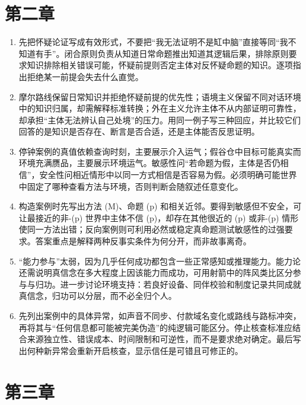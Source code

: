 \section*{第二章}

\begin{enumerate}
\item 先把怀疑论证写成有效形式，不要把“我无法证明不是缸中脑”直接等同“我不知道有手”。闭合原则负责从知道日常命题推出知道其逻辑后果，排除原则要求知识排除相关错误可能，怀疑前提则否定主体对反怀疑命题的知识。逐项指出拒绝某一前提会失去什么直觉。
\item 摩尔路线保留日常知识并拒绝怀疑前提的优先性；语境主义保留不同对话环境中的知识归属，却需解释标准转换；外在主义允许主体不从内部证明可靠性，却承担“主体无法辨认自己处境”的压力。用同一例子写三种回应，并比较它们回答的是知识是否存在、断言是否合适，还是主体能否反思证明。
\item 停钟案例的真值依赖查询时刻，主要展示介入运气；假谷仓中目标可能真实而环境充满赝品，主要展示环境运气。敏感性问“若命题为假，主体是否仍相信”，安全性问相近情形中以同一方式相信是否容易为假。必须明确可能世界中固定了哪种查看方法与环境，否则判断会随叙述任意变化。
\item 构造案例时先写出方法 (M)、命题 (p) 和相关近邻。要得到敏感但不安全，可让最接近的非-(p) 世界中主体不信 (p)，却存在其他很近的 (p) 或非-(p) 情形使同一方法出错；反向案例则可利用必然或稳定真命题测试敏感性的过强要求。答案重点是解释两种反事实条件为何分开，而非故事离奇。
\item “能力参与”太弱，因为几乎任何成功都包含一些正常感知或推理能力。能力论还需说明真信念在多大程度上因该能力而成功，可用射箭中的阵风类比区分参与与归功。进一步讨论环境支持：若良好设备、同伴校验和制度记录共同成就真信念，归功可以分层，而不必全归个人。
\item 先列出案例中的具体异常，如声音不同步、付款域名变化或路线与路标冲突，再将其与“任何信息都可能被完美伪造”的纯逻辑可能区分。停止核查标准应结合来源独立性、错误成本、时间限制和可逆性，而不是要求绝对确定。最后写出何种新异常会重新开启核查，显示信任是可错且可修正的。
\end{enumerate}

\section*{第三章}

